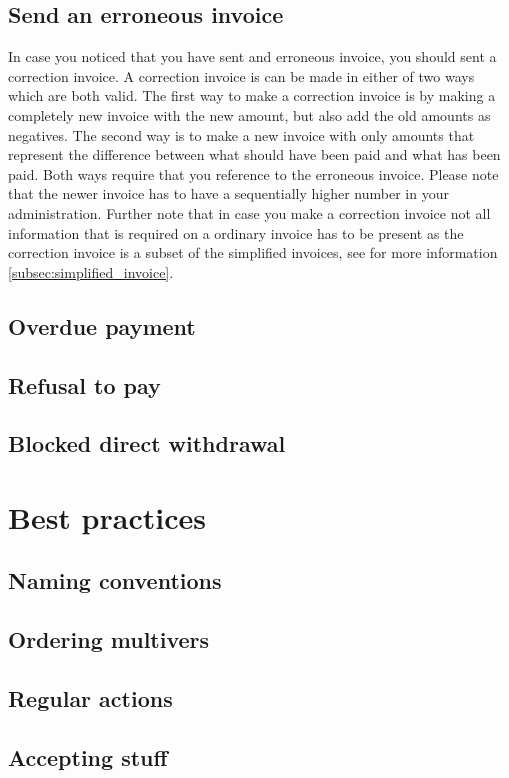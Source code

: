 \documentclass{report}
\begin{document}
\subsection{Send an erroneous invoice}
In case you noticed that you have sent and erroneous invoice, you should sent a correction invoice. A correction invoice is can be made in either of two ways which are both valid. 
The first way to make a correction invoice is by making a completely new invoice with the new amount, but also add the old amounts as negatives.
The second way is to make a new invoice with only amounts that represent the difference between what should have been paid and what has been paid. 
Both ways require that you reference to the erroneous invoice. Please note that the newer invoice has to have a sequentially higher number in your administration. Further note that in case you make a correction invoice not all information that is required on a ordinary invoice has to be present as the correction invoice is a subset of the simplified invoices, see for more information \ref{subsec:simplified_invoice}.

\subsection{Overdue payment}
\subsection{Refusal to pay}
\subsection{Blocked direct withdrawal}
\section{Best practices}
\subsection{Naming conventions}
\subsection{Ordering multivers}
\subsection{Regular actions}
\subsection{Accepting stuff}
\end{document}
